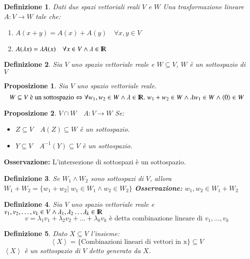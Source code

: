 \documentclass[12pt,a4paper]{article}
\theoremstyle{break}
\newtheorem{definition}{Definizione}[subsection]
\newtheorem{proposition}{Proposizione}[subsection]
\newcommand\R{{\rm I\!R}}
\begin{document}
    \begin{definition}
        Dati due spazi vettoriali reali $V$ e $W$\newline
        Una trasformazione lineare $A:V\rightarrow W$ tale che:
        \begin{enumerate}
            \item $A(x+y) = A(x) + A(y)\quad\forall x,y\in V$
            \item $A(\lambda x) = \lambda A(x)\quad\forall x\in V \wedge \lambda\in\R$
        \end{enumerate}
    \end{definition}
    \begin{definition}
        Sia $V$ uno spazio vettoriale reale e $W\subseteq V$, $W$ è un sottospazio di $V$
    \end{definition}
    \begin{proposition}
        Sia $V$ uno spazio vettoriale reale.
        \[W\subseteq V \text{ è un sottospazio}\Leftrightarrow \forall w_1,w_2\in W \wedge \lambda\in \R .\; w_1+w_2\in W\wedge\lambda w_1 \in W \wedge \langle 0 \rangle \in W\]
    \end{proposition}
    \begin{proposition}
        $V\cap W\quad A:V\rightarrow W$ Se:
        \begin{itemize}
            \item $Z\subseteq V\quad A(Z) \subseteq W$ è un sottospazio.
            \item $Y\subseteq V\quad A^{-1}(Y)\subseteq V$ è un sottospazio.
        \end{itemize}
    \end{proposition}
    \textbf{Osservazione:} L'intersezione di sottospazi è un sottospazio.
    \begin{definition}
        Se $W_1 \wedge W_2$ sono sottospazi di $V$, allora $W_1+W_2 = \{w_1 + w_2 |\; w_1\in W_1 \wedge w_2 \in W_2\}$
        \newline
        \textbf{Osservazione:} $w_1,w_2 \in W_1+W_2$ 
    \end{definition}
    \newpage
    \begin{definition}
        Sia $V$ uno spazio vettoriale reale e $v_1,v_2,\dots,v_k\in V \wedge \lambda_1,\lambda_2\dots\lambda_k \in\R$
        \[v = \lambda_1v_1+\lambda_2v_2+\dots +\lambda_kv_k \text{ è detta combinazione lineare di } v_1,\dots ,v_k\]
    \end{definition}
    \begin{definition}
        Dato $X\subseteq V$ l'insieme:
        \[\left<X\right> = \{\text{Combinazioni lineari di vettori in x}\}\subseteq V\]
        $\left<X\right>$ è un sottospazio di $V$ detto generato da $X$.
    \end{definition}
\end{document}
